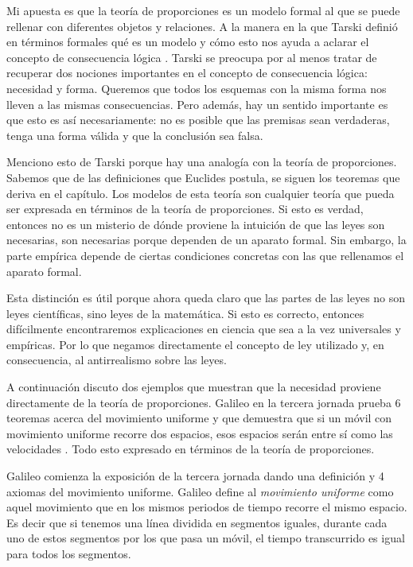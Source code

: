 Mi apuesta es que la teoría de proporciones es un modelo formal al que se puede rellenar con diferentes objetos y relaciones. A la manera en la que Tarski definió en términos formales qué es un modelo y cómo esto nos ayuda a aclarar el concepto de consecuencia lógica \cite{Tarski1956}. Tarski se preocupa por al menos tratar de recuperar dos nociones importantes en el concepto de consecuencia lógica: necesidad y forma. \cite{Torrente2000} Queremos que todos los esquemas con la misma forma nos lleven a las mismas consecuencias. Pero además, hay un sentido importante es que esto es así necesariamente: no es posible que las premisas sean verdaderas, tenga una forma válida y que la conclusión sea falsa.

Menciono esto de Tarski porque hay una analogía con la teoría de proporciones. Sabemos que de las definiciones que Euclides postula, se siguen los teoremas que deriva en el capítulo. Los modelos de esta teoría son cualquier teoría que pueda ser expresada en términos de la teoría de proporciones. Si esto es verdad, entonces no es un misterio de dónde proviene la intuición de que las leyes son necesarias, son necesarias porque dependen de un aparato formal. Sin embargo, la parte empírica depende de ciertas condiciones concretas con las que rellenamos el aparato formal.

Esta distinción es útil porque ahora queda claro que las partes de las leyes no son leyes científicas, sino leyes de la matemática. Si esto es correcto, entonces difícilmente encontraremos explicaciones en ciencia que sea a la vez universales y empíricas. Por lo que negamos directamente el concepto de ley utilizado y, en consecuencia, al antirrealismo sobre las leyes.

A continuación discuto dos ejemplos que muestran que la necesidad proviene directamente de la teoría de proporciones. Galileo en la tercera jornada prueba 6 teoremas acerca del movimiento uniforme y que demuestra que si un móvil con movimiento uniforme recorre dos espacios, esos espacios serán entre sí como las velocidades \cite[p. 215]{galtre}. Todo esto expresado en términos de la teoría de proporciones.

Galileo comienza la exposición de la tercera jornada dando una definición y 4 axiomas del movimiento uniforme. Galileo define al \textit{movimiento uniforme} como aquel movimiento que en los mismos periodos de tiempo recorre el mismo espacio. Es decir que si tenemos una línea dividida en segmentos iguales, durante cada uno de estos segmentos por los que pasa un móvil, el tiempo transcurrido es igual para todos los segmentos.

